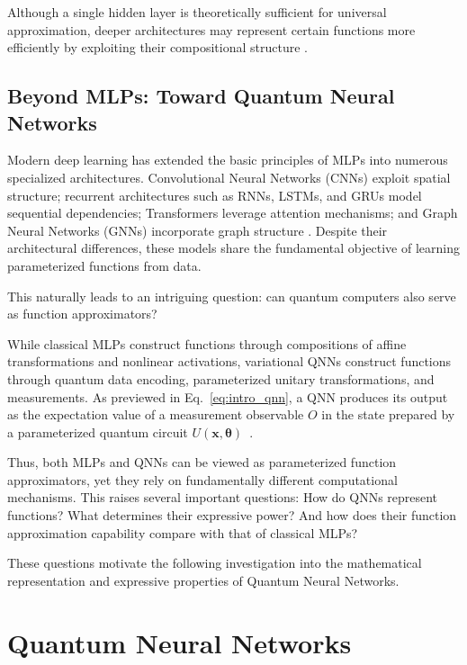 \documentclass[12pt]{article}
\numberwithin{equation}{section}  %
\begin{document}
Although a single hidden layer is theoretically sufficient for universal approximation, deeper architectures may represent certain functions more efficiently by exploiting their compositional structure \cite{goodfellow2016deep,telgarsky2016benefits}.

\subsection{Beyond MLPs: Toward Quantum Neural Networks}

Modern deep learning has extended the basic principles of MLPs into numerous specialized architectures. Convolutional Neural Networks (CNNs) exploit spatial structure; recurrent architectures such as RNNs, LSTMs, and GRUs model sequential dependencies; Transformers leverage attention mechanisms; and Graph Neural Networks (GNNs) incorporate graph structure \cite{goodfellow2016deep,vaswani2017attention,scarselli2009graph}. Despite their architectural differences, these models share the fundamental objective of learning parameterized functions from data.

This naturally leads to an intriguing question: can quantum computers also serve as function approximators?

While classical MLPs construct functions through compositions of affine transformations and nonlinear activations, variational QNNs construct functions through quantum data encoding, parameterized unitary transformations, and measurements. As previewed in Eq.~\eqref{eq:intro_qnn}, a QNN produces its output as the expectation value of a measurement observable $O$ in the state prepared by a parameterized quantum circuit $U(\mathbf{x},\boldsymbol{\theta})$~\cite{mitarai2018quantum,benedetti2019parameterized}.

Thus, both MLPs and QNNs can be viewed as parameterized function approximators, yet they rely on fundamentally different computational mechanisms. This raises several important questions: How do QNNs represent functions? What determines their expressive power? And how does their function approximation capability compare with that of classical MLPs?

These questions motivate the following investigation into the mathematical representation and expressive properties of Quantum Neural Networks.


\section{Quantum Neural Networks}
\label{sec:quantum_basics}
\end{document}
